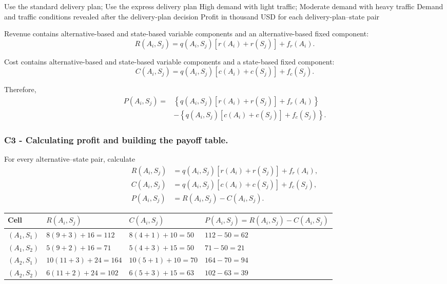\DecisionElementsTable
{Use the standard delivery plan; Use the express delivery plan}
{High demand with light traffic; Moderate demand with heavy traffic}
{Demand and traffic conditions revealed after the delivery-plan decision}
{Profit in thousand USD for each delivery-plan--state pair}

Revenue contains alternative-based and state-based variable components and
an alternative-based fixed component:
\[
R(A_i,S_j)
=
q(A_i,S_j)
\left[
r(A_i)+r(S_j)
\right]
+
f_r(A_i).
\]

Cost contains alternative-based and state-based variable components and a
state-based fixed component:
\[
C(A_i,S_j)
=
q(A_i,S_j)
\left[
c(A_i)+c(S_j)
\right]
+
f_c(S_j).
\]

Therefore,
\[
\begin{aligned}
	P(A_i,S_j)
	={}&
	\left\{
	q(A_i,S_j)
	\left[
	r(A_i)+r(S_j)
	\right]
	+
	f_r(A_i)
	\right\}
	\\
	&-
	\left\{
	q(A_i,S_j)
	\left[
	c(A_i)+c(S_j)
	\right]
	+
	f_c(S_j)
	\right\}.
\end{aligned}
\]


\subsubsection*{C3 - Calculating profit and building the payoff table.}
\label{subsec:problem15-regional-parcel-delivery-c3}

For every alternative--state pair, calculate
\[
\begin{aligned}
	R(A_i,S_j)
	&=
	q(A_i,S_j)
	\left[
	r(A_i)+r(S_j)
	\right]
	+
	f_r(A_i),
	\\
	C(A_i,S_j)
	&=
	q(A_i,S_j)
	\left[
	c(A_i)+c(S_j)
	\right]
	+
	f_c(S_j),
	\\
	P(A_i,S_j)
	&=
	R(A_i,S_j)-C(A_i,S_j).
\end{aligned}
\]

\begin{center}
	\small
	\begin{tabular}{llll}
		\toprule
		Cell
		& \(R(A_i,S_j)\)
		& \(C(A_i,S_j)\)
		& \(P(A_i,S_j)=R(A_i,S_j)-C(A_i,S_j)\) \\
		\midrule
		\((A_1,S_1)\)
		& \(8(9+3)+16=112\)
		& \(8(4+1)+10=50\)
		& \(112-50=62\) \\
		
		\((A_1,S_2)\)
		& \(5(9+2)+16=71\)
		& \(5(4+3)+15=50\)
		& \(71-50=21\) \\
		
		\((A_2,S_1)\)
		& \(10(11+3)+24=164\)
		& \(10(5+1)+10=70\)
		& \(164-70=94\) \\
		
		\((A_2,S_2)\)
		& \(6(11+2)+24=102\)
		& \(6(5+3)+15=63\)
		& \(102-63=39\) \\
		\bottomrule
	\end{tabular}
\end{center}

